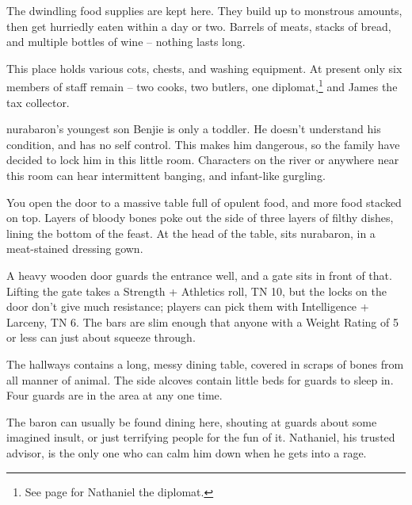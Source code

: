 \begin{multicols}{2}
The dwindling food supplies are kept here.  They build up to monstrous amounts, then get hurriedly eaten within a day or two.  Barrels of meats, stacks of bread, and multiple bottles of wine -- nothing lasts long.


This place holds various cots, chests, and washing equipment.  At present only six members of staff remain -- two cooks, two butlers, one diplomat,\footnote{See page \pageref{nathaniel} for Nathaniel the diplomat.} and James the tax collector.


\Gls{nurabaron}'s youngest son Benjie is only a toddler.
He doesn't understand his condition, and has no self control.
This makes him dangerous, so the family have decided to lock him in this little room.
Characters on the river or anywhere near this room can hear intermittent banging, and infant-like gurgling.



\begin{boxtext}

	You open the door to a massive table full of opulent food, and more food stacked on top.  Layers of bloody bones poke out the side of three layers of filthy dishes, lining the bottom of the feast.  At the head of the table, sits \gls{nurabaron}, in a meat-stained dressing gown.

\end{boxtext}

A heavy wooden door guards the entrance well, and a gate sits in front of that.  Lifting the gate takes a Strength + Athletics roll, TN 10, but the locks on the door don't give much resistance; players can pick them with Intelligence + Larceny, TN 6.  The bars are slim enough that anyone with a Weight Rating of 5 or less can just about squeeze through.

The hallways contains a long, messy dining table, covered in scraps of bones from all manner of animal.  The side alcoves contain little beds for guards to sleep in.  Four guards are in the area at any one time.

The baron can usually be found dining here, shouting at guards about some imagined insult, or just terrifying people for the fun of it.  Nathaniel, his trusted advisor, is the only one who can calm him down when he gets into a rage.


\end{multicols}
